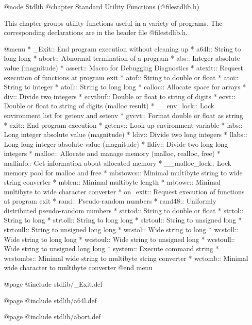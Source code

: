 @node Stdlib
@chapter Standard Utility Functions (@file{stdlib.h})

This chapter groups utility functions useful in a variety of programs.
The corresponding declarations are in the header file @file{stdlib.h}.

@menu 
* _Exit::       End program execution without cleaning up
* a64l::        String to long long
* abort::       Abnormal termination of a program
* abs::         Integer absolute value (magnitude)
* assert::      Macro for Debugging Diagnostics
* atexit::      Request execution of functions at program exit
* atof::        String to double or float
* atoi::        String to integer
* atoll::       String to long long
* calloc::      Allocate space for arrays
* div::         Divide two integers
* ecvtbuf::     Double or float to string of digits
* ecvt::        Double or float to string of digits (malloc result)
* __env_lock::		Lock environment list for getenv and setenv
* gvcvt::       Format double or float as string
* exit::        End program execution
* getenv::      Look up environment variable
* labs::        Long integer absolute value (magnitude)
* ldiv::        Divide two long integers
* llabs::       Long long integer absolute value (magnitude)
* lldiv::       Divide two long long integers
* malloc::      Allocate and manage memory (malloc, realloc, free)
* mallinfo::	Get information about allocated memory
* __malloc_lock::	Lock memory pool for malloc and free
* mbstowcs::	Minimal multibyte string to wide string converter
* mblen::	Minimal multibyte length
* mbtowc::      Minimal multibyte to wide character converter
* on_exit::     Request execution of functions at program exit
* rand::        Pseudo-random numbers
* rand48::      Uniformly distributed pseudo-random numbers
* strtod::      String to double or float
* strtol::      String to long
* strtoll::     String to long long
* strtoul::     String to unsigned long
* strtoull::    String to unsigned long long
* wcstol::      Wide string to long
* wcstoll::     Wide string to long long
* wcstoul::     Wide string to unsigned long
* wcstoull::    Wide string to unsigned long long
* system::      Execute command string
* wcstombs::	Minimal wide string to multibyte string converter
* wctomb::      Minimal wide character to multibyte converter
@end menu

@page
@include stdlib/_Exit.def

@page
@include stdlib/a64l.def

@page
@include stdlib/abort.def

